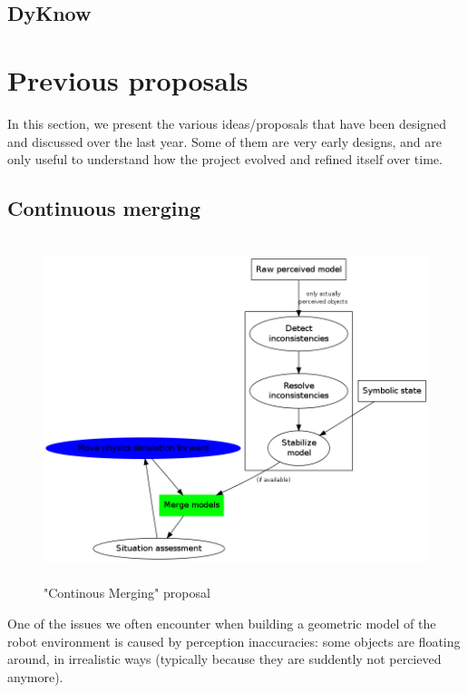 \documentclass[a4paper]{article}
\begin{document}
\subsection{DyKnow}




\section{Previous proposals}

In this section, we present the various ideas/proposals that have been designed
and discussed over the last year. Some of them are very early designs, and are
only useful to understand how the project evolved and refined itself over time.

\subsection{Continuous merging}

\begin{figure}[!h]
    \centering
    \includegraphics[height=10cm]{images/spark_archi0.png}
    \caption{"Continous Merging" proposal}
    \label{fig|continousmerging}
\end{figure}

One of the issues we often encounter when building a geometric model of the
robot environment is caused by perception inaccuracies: some objects are
floating around, in irrealistic ways (typically because they are suddently not
percieved anymore).
\end{document}
